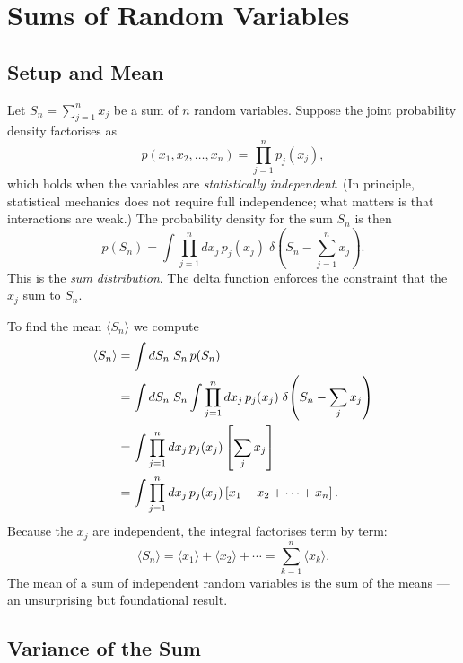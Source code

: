\section{Sums of Random Variables}

\subsection{Setup and Mean}

Let $S_n = \sum_{j=1}^{n} x_j$ be a sum of $n$ random variables. Suppose the joint probability density factorises as
\begin{equation}
    p(x_1, x_2, \ldots, x_n) = \prod_{j=1}^{n} p_j(x_j),
\end{equation}
which holds when the variables are \emph{statistically independent}. (In principle, statistical mechanics does not require full independence; what matters is that interactions are weak.) The probability density for the sum $S_n$ is then
\begin{equation}
    p(S_n) = \int \prod_{j=1}^{n} dx_j\, p_j(x_j)\; \delta\!\left(S_n - \sum_{j=1}^{n} x_j\right). \label{eq:sum_dist}
\end{equation}
This is the \emph{sum distribution}. The delta function enforces the constraint that the $x_j$ sum to $S_n$.

To find the mean $\langle S_n\rangle$ we compute
\begin{align}
    \langle S_n\rangle &= \int dS_n\; S_n\, p(S_n) \notag \\
    &= \int dS_n\; S_n \int \prod_{j=1}^{n} dx_j\, p_j(x_j)\;\delta\!\left(S_n - \sum_j x_j\right) \notag \\
    &= \int \prod_{j=1}^{n} dx_j\, p_j(x_j)\left[\sum_j x_j\right] \notag \\
    &= \int \prod_{j=1}^{n} dx_j\, p_j(x_j)\left[x_1 + x_2 + \cdots + x_n\right].
\end{align}
Because the $x_j$ are independent, the integral factorises term by term:
\begin{equation}
    \langle S_n\rangle = \langle x_1\rangle + \langle x_2\rangle + \cdots = \sum_{k=1}^{n}\langle x_k\rangle.
\end{equation}
The mean of a sum of independent random variables is the sum of the means — an unsurprising but foundational result.

\subsection{Variance of the Sum}

